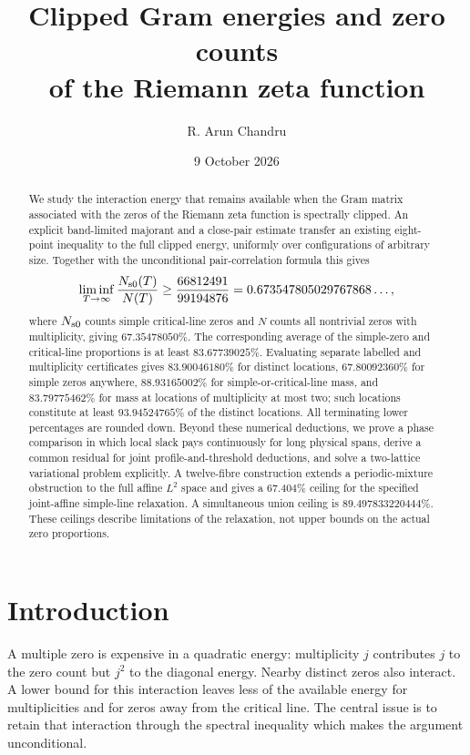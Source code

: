 \documentclass[11pt,reqno]{amsart}
\title[Clipped Gram energies and zero counts]{Clipped Gram energies and zero counts \\of the Riemann zeta function}
\author{R. Arun Chandru}
\date{9 October 2026}
\numberwithin{equation}{section}
\begin{document}
\raggedbottom
\begin{abstract}
We study the interaction energy that remains available when the Gram
matrix associated with the zeros of the Riemann zeta function is
spectrally clipped. An explicit band-limited majorant and a close-pair
estimate transfer an existing eight-point inequality to the full clipped
energy, uniformly over configurations of arbitrary size. Together with
the unconditional pair-correlation formula this gives
\[
 \liminf_{T\to\infty}\frac{N_{\rm s0}(T)}{N(T)}
 \ge\frac{66812491}{99194876}=0.673547805029767868\ldots,
\]
where \(N_{\rm s0}\) counts simple critical-line zeros and \(N\) counts
all nontrivial zeros with multiplicity, giving \(67.35478050\%\). The corresponding average of
the simple-zero and critical-line proportions is at least
\(83.67739025\%\). Evaluating separate labelled and multiplicity
certificates gives \(83.90046180\%\) for distinct locations,
\(67.80092360\%\) for simple zeros anywhere,
\(88.93165002\%\) for simple-or-critical-line mass, and
\(83.79775462\%\) for mass at locations of multiplicity at most two;
such locations constitute at least \(93.94524765\%\) of the distinct
locations. All terminating lower percentages are rounded down.
Beyond these numerical deductions, we prove a phase comparison in which
local slack pays continuously for long physical spans, derive a common
residual for joint profile-and-threshold deductions, and solve a
two-lattice variational problem explicitly. A twelve-fibre construction
extends a periodic-mixture obstruction to the full affine \(L^2\) space
and gives a \(67.404\%\) ceiling for the specified joint-affine
simple-line relaxation. A simultaneous union ceiling is
\(89.497833220444\%\). These ceilings describe limitations of the
relaxation, not upper bounds on the actual zero proportions.
\end{abstract}
\maketitle
\tableofcontents

\section{Introduction}

A multiple zero is expensive in a quadratic energy: multiplicity \(j\)
contributes \(j\) to the zero count but \(j^2\) to the diagonal
energy. Nearby distinct zeros also interact. A lower bound for this
interaction leaves less of the available energy for multiplicities and
for zeros away from the critical line. The central issue is to retain
that interaction through the spectral inequality which makes the
argument unconditional.
\end{document}
